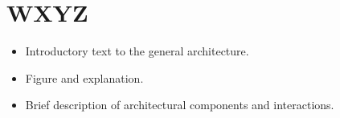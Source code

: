 \section{WXYZ} 
\label{sec:architecture}


\begin{itemize}
    \item Introductory text to the general architecture.
    \item Figure and explanation.
    \item Brief description of architectural components and interactions.
\end{itemize}

\blindtext[8]

\newpage